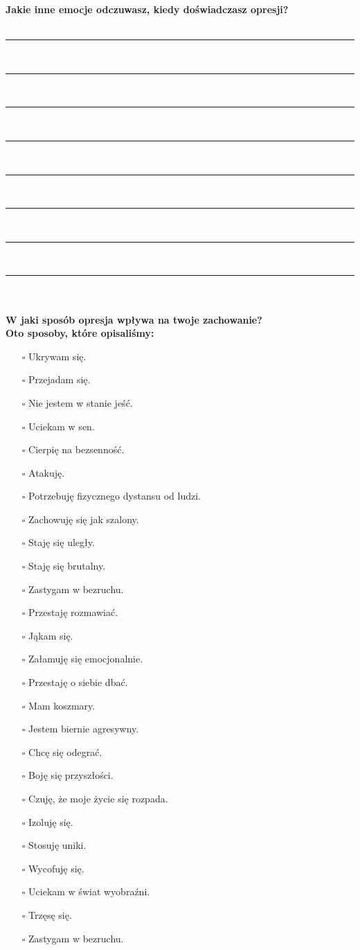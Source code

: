 \newpage
\noindent
\textcolor{ProcessBlue}{\textbf{\Large{Jakie inne emocje odczuwasz, kiedy doświadczasz opresji?}}}\\\\
\noindent\rule{\textwidth}{1pt}\\
\noindent\rule{\textwidth}{1pt}\\
\noindent\rule{\textwidth}{1pt}\\
\noindent\rule{\textwidth}{1pt}\\
\noindent\rule{\textwidth}{1pt}\\
\noindent\rule{\textwidth}{1pt}\\
\noindent\rule{\textwidth}{1pt}\\
\noindent\rule{\textwidth}{1pt}\\\\

\noindent\textcolor{ProcessBlue}{\textbf{\Large{W jaki sposób opresja wpływa na twoje zachowanie?}}}\\
\textbf{\large{Oto sposoby, które opisaliśmy:}}
\begin{multicols}{2}
\begin{itemize}
\item[$\square$]{Ukrywam się.}
\item[$\square$]{Przejadam się.}
\item[$\square$]{Nie jestem w stanie jeść.}
\item[$\square$]{Uciekam w sen.}
\item[$\square$]{Cierpię na bezsenność.}
\item[$\square$]{Atakuję.}
\item[$\square$]{Potrzebuję fizycznego dystansu od ludzi.}
\item[$\square$]{Zachowuję się jak szalony.}
\item[$\square$]{Staję się uległy.}
\item[$\square$]{Staję się brutalny.}
\item[$\square$]{Zastygam w bezruchu.}
\item[$\square$]{Przestaję rozmawiać.}
\item[$\square$]{Jąkam się.}
\item[$\square$]{Załamuję się emocjonalnie.}
\item[$\square$]{Przestaję o siebie dbać.}
\item[$\square$]{Mam koszmary.}
\item[$\square$]{Jestem biernie agresywny.}
\item[$\square$]{Chcę się odegrać.}
\item[$\square$]{Boję się przyszłości.}
\item[$\square$]{Czuję, że moje życie się rozpada.}
\item[$\square$]{Izoluję się.}
\item[$\square$]{Stosuję uniki.}
\item[$\square$]{Wycofuję się.}
\item[$\square$]{Uciekam w świat wyobraźni.}
\item[$\square$]{Trzęsę się.}
\item[$\square$]{Zastygam w bezruchu.}
\end{itemize}
\end{multicols}


